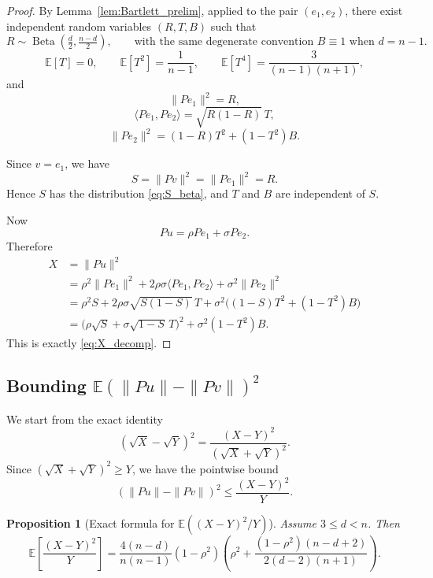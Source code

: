 \documentclass{article}
\DeclareMathOperator{\BetaDist}{Beta}
\newtheorem{proposition}{Proposition}
\begin{document}
\begin{proof}
By Lemma~\ref{lem:Bartlett_prelim}, applied to the pair $(e_1,e_2)$, there exist independent random variables $(R,T,B)$ such that
\[
R\sim \BetaDist\!\left(\tfrac d2,\tfrac{n-d}{2}\right),
\qquad
\mbox{with the same degenerate convention \(B\equiv1\) when \(d=n-1\).}
\]
\[
\mathbb E[T]=0,
\qquad
\mathbb E[T^2]=\frac{1}{n-1},
\qquad
\mathbb E[T^4]=\frac{3}{(n-1)(n+1)},
\]
and
\begin{equation}
\|Pe_1\|^2 = R,
\label{eq:B2_R}
\end{equation}
\begin{equation}
\langle Pe_1,Pe_2\rangle = \sqrt{R(1-R)}\,T,
\label{eq:B2_cross}
\end{equation}
\begin{equation}
\|Pe_2\|^2 = (1-R)T^2 + (1-T^2)B.
\label{eq:B2_Pe2}
\end{equation}

Since $v=e_1$, we have
\[
S=\|Pv\|^2=\|Pe_1\|^2=R.
\]
Hence $S$ has the distribution \eqref{eq:S_beta}, and $T$ and $B$ are independent of $S$.

Now
\[
Pu=\rho Pe_1+\sigma Pe_2.
\]
Therefore
\begin{align*}
X
&=\|Pu\|^2 \\
&=\rho^2\|Pe_1\|^2 + 2\rho\sigma\langle Pe_1,Pe_2\rangle + \sigma^2\|Pe_2\|^2 \\
&=\rho^2 S + 2\rho\sigma\sqrt{S(1-S)}\,T + \sigma^2\bigl((1-S)T^2 + (1-T^2)B\bigr) \\
&=\bigl(\rho\sqrt S+\sigma\sqrt{1-S}\,T\bigr)^2 + \sigma^2(1-T^2)B.
\end{align*}
This is exactly \eqref{eq:X_decomp}.
\end{proof}

\subsection{Bounding $\mathbb E(\|Pu\|-\|Pv\|)^2$}

We start from the exact identity
\begin{equation}
(\sqrt X-\sqrt Y)^2=\frac{(X-Y)^2}{(\sqrt X+\sqrt Y)^2}.
\label{eq:sqrt_identity}
\end{equation}
Since $(\sqrt X+\sqrt Y)^2\ge Y$, we have the pointwise bound
\begin{equation}
(\|Pu\|-\|Pv\|)^2\le \frac{(X-Y)^2}{Y}.
\label{eq:drop_denom_to_Y}
\end{equation}

\begin{proposition}[Exact formula for \(\mathbb E((X-Y)^2/Y)\)]
\label{prop:exact_Delta2_over_Y}
Assume \(3\le d<n\). Then
\[
\mathbb E\!\left[\frac{(X-Y)^2}{Y}\right]
=
\frac{4(n-d)}{n(n-1)}(1-\rho^2)
\left(
\rho^2+
\frac{(1-\rho^2)(n-d+2)}{2(d-2)(n+1)}
\right).
\]
\end{proposition}
\end{document}
